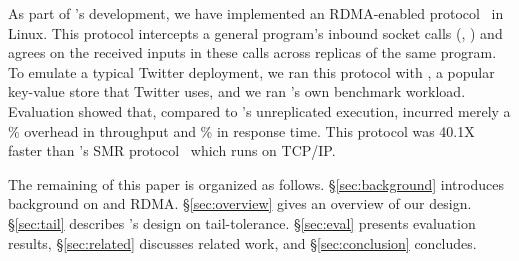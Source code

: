 
As part of \xxx's development, we have implemented an RDMA-enabled \paxos 
protocol~\cite{falcon:github} in Linux. This protocol intercepts a general 
program's inbound socket calls (\eg, \recv) and agrees on the received inputs 
in these calls across replicas of the same program. To emulate a typical 
Twitter deployment, we ran this protocol with \redis, a popular key-value store 
that Twitter uses, and we ran \redis's own benchmark workload. Evaluation 
showed that, compared to \redis's unreplicated execution, \xxx
incurred merely a \tputoverhead\% overhead in throughput and \latencyoverhead\% 
in response time. This protocol was 40.1X faster than \zookeeper's SMR 
protocol~\cite{calvin:sigmod12} which runs on TCP/IP.


The remaining of this paper is organized as follows. \S\ref{sec:background} 
introduces background on \paxos and RDMA. \S\ref{sec:overview} gives an 
overview of our \xxx design. \S\ref{sec:tail} describes \xxx's design on 
tail-tolerance. \S\ref{sec:eval} presents evaluation results, 
\S\ref{sec:related} discusses related work, and \S\ref{sec:conclusion} 
concludes.   


